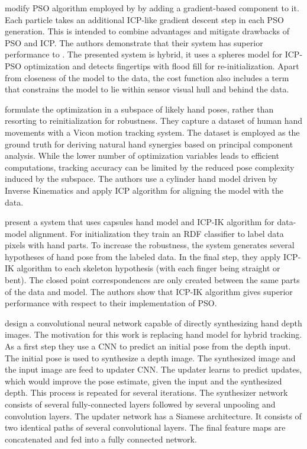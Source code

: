 \hspace{-0.4em}
\textbf{\cite{qian2014realtime}} 
modify PSO algorithm employed by \cite{oiko2011hand} by adding a gradient-based component to it. Each particle takes an additional ICP-like gradient descent step in each PSO generation. This is intended to combine advantages and mitigate drawbacks of PSO and ICP. The authors demonstrate that their system has superior performance to \cite{oiko2011hand}. The presented system is hybrid, it uses a spheres model for ICP-PSO optimization and detects fingertips with flood fill for re-initialization.  Apart from closeness of the model to the data, the cost function also includes a term that constrains the model to lie within sensor visual hull and behind the data.

\hspace{-0.4em}
\textbf{\cite{schroder2014real}} 
formulate the optimization in a subspace of likely hand poses, rather than resorting to reinitialization for robustness. They capture a dataset of human hand movements with a Vicon motion tracking system. The dataset is employed as the ground truth for deriving natural hand synergies based on principal component analysis. While the lower number of optimization variables leads to efficient computations, tracking accuracy can be limited by the reduced pose complexity induced by the subspace. The authors use a cylinder hand model driven by Inverse Kinematics and apply ICP algorithm for aligning the model with the data.

\hspace{-0.4em}
\textbf{\cite{fleishman2015icpik}} 
present a system that uses capsules hand model and ICP-IK algorithm for data-model alignment. For initialization they train an RDF classifier to label data pixels with hand parts. To increase the robustness, the system generates several hypotheses of hand pose from the labeled data. In the final step, they apply ICP-IK algorithm to each skeleton hypothesis (with each finger being straight or bent). The closed point correspondences are only created between the same parts of the data and model. The authors show that ICP-IK algorithm gives superior performance with respect to their implementation of PSO.

\hspace{-0.4em}
\textbf{\cite{oberweger2015feedback}} 
design a convolutional neural network capable of directly synthesizing hand depth images. The motivation for this work is replacing hand model for hybrid tracking. As a first step they use a CNN to predict an initial pose from the depth input. The initial pose is used to synthesize a depth image. The synthesized image and the input image are feed to updater CNN. The updater learns to predict updates, which would improve the pose estimate, given the input and the synthesized depth. This process is repeated for several iterations. The synthesizer network consists of several fully-connected layers followed by several unpooling and convolution layers. The updater network has a Siamese architecture. It consists of two identical paths of several convolutional layers. The final feature maps are concatenated and fed into a fully connected network.


